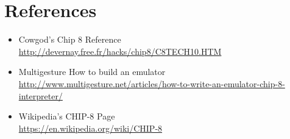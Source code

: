 \documentclass[12pt]{IEEEtran}
\begin{document}
\section{References}
\begin{itemize}
    \item Cowgod's Chip 8 Reference\\ \href{http://devernay.free.fr/hacks/chip8/C8TECH10.HTM}{http://devernay.free.fr/hacks/chip8/C8TECH10.HTM}
    \item Multigesture How to build an emulator\\ \href{http://www.multigesture.net/articles/how-to-write-an-emulator-chip-8-interpreter/}{http://www.multigesture.net/articles/how-to-write-an-emulator-chip-8-interpreter/}
    \item Wikipedia's CHIP-8 Page\\ \href{https://en.wikipedia.org/wiki/CHIP-8}{https://en.wikipedia.org/wiki/CHIP-8}
\end{itemize}
\end{document}
